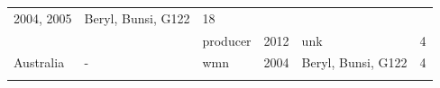 \documentclass[fleqn,10pt,lineno]{wlpeerj} %
\theoremstyle{definition}
\theoremstyle{definition}
\theoremstyle{definition}
\theoremstyle{remark}
\begin{document}
\begin{longtable}[]{@{}lllrlr@{}}
\begin{minipage}[t]{0.19\columnwidth}
2004, 2005\strut
\end{minipage} & \begin{minipage}[t]{0.29\columnwidth}\raggedright\strut
Beryl, Bunsi, G122\strut
\end{minipage} & \begin{minipage}[t]{0.04\columnwidth}\raggedleft\strut
18\strut
\end{minipage}\tabularnewline
\begin{minipage}[t]{0.11\columnwidth}\raggedright\strut
\strut
\end{minipage} & \begin{minipage}[t]{0.08\columnwidth}\raggedright\strut
\strut
\end{minipage} & \begin{minipage}[t]{0.12\columnwidth}\raggedright\strut
producer\strut
\end{minipage} & \begin{minipage}[t]{0.19\columnwidth}\raggedleft\strut
2012\strut
\end{minipage} & \begin{minipage}[t]{0.29\columnwidth}\raggedright\strut
unk\strut
\end{minipage} & \begin{minipage}[t]{0.04\columnwidth}\raggedleft\strut
4\strut
\end{minipage}\tabularnewline
\begin{minipage}[t]{0.11\columnwidth}\raggedright\strut
Australia\strut
\end{minipage} & \begin{minipage}[t]{0.08\columnwidth}\raggedright\strut
-\strut
\end{minipage} & \begin{minipage}[t]{0.12\columnwidth}\raggedright\strut
wmn\strut
\end{minipage} & \begin{minipage}[t]{0.19\columnwidth}\raggedleft\strut
2004\strut
\end{minipage} & \begin{minipage}[t]{0.29\columnwidth}\raggedright\strut
Beryl, Bunsi, G122\strut
\end{minipage} & \begin{minipage}[t]{0.04\columnwidth}\raggedleft\strut
4\strut
\end{minipage}\tabularnewline
\begin{minipage}[t]{0.11\columnwidth}\raggedright\strut
\strut
\end{minipage} & \begin{minipage}[t]{0.08\columnwidth}\raggedright\strut

\end{minipage}
\end{longtable}
\end{document}
